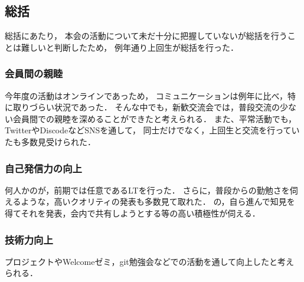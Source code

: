 \subsection*{\firstGrade{}総括}



\firstGrade{}総括にあたり，
本会の活動について未だ十分に把握していない\firstGrade{}が総括を行うことは難しいと判断したため，
例年通り上回生が総括を行った．


\subsubsection*{会員間の親睦}
今年度の活動はオンラインであっため，
コミュニケーションは例年に比べ，特に取りづらい状況であった．
そんな中でも，新歓交流会では，普段交流の少ない会員間での親睦を深めることができたと考えられる．
また、平常活動でも，TwitterやDiscodeなどSNSを通して，
\firstGrade{}同士だけでなく，上回生と交流を行っていた\firstGrade{}も多数見受けられた．


\subsubsection*{自己発信力の向上}
何人かの\firstGrade{}が，前期では任意であるLTを行った．
さらに，普段からの勤勉さを伺えるような，高いクオリティの発表も多数見て取れた．
\firstGrade{}の，自ら進んで知見を得てそれを発表，会内で共有しようとする等の高い積極性が伺える．


\subsubsection*{技術力向上}
プロジェクトやWelcomeゼミ，git勉強会などでの活動を通して向上したと考えられる．